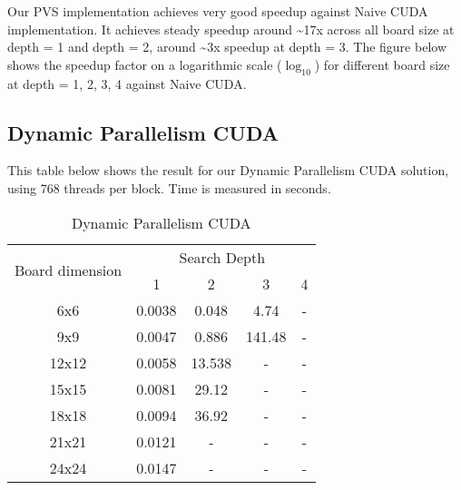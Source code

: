 \noindent
Our PVS implementation achieves very good speedup against Naive CUDA implementation. It achieves steady speedup around \textasciitilde{17}x across all board size at depth = 1 and depth = 2, around \textasciitilde{3}x speedup at depth = 3. The figure  below shows the speedup factor on a logarithmic scale ($\log_{10}$) for different board size at depth = 1, 2, 3, 4 against Naive CUDA.\\


\subsection{Dynamic Parallelism CUDA}
This table below shows the result for our Dynamic Parallelism CUDA solution, using 768 threads per block. Time is measured in seconds.\\

\begin{table}[!htbp]
\centering
\begin{tabular}{|c|c|c|c|c|} 
\hline
\multirow{2}{*}{Board dimension} & \multicolumn{4}{c|}{Search Depth}     \\ 
\cline{2-5}
                                 & 1       & 2      & 3       & 4        \\ 
\hline
6x6                              & 0.0038 & 0.048 & 4.74  & -    \\ 
\hline
9x9                              & 0.0047 & 0.886 & 141.48  & -   \\ 
\hline
12x12                            & 0.0058 & 13.538 & -  & -  \\ 
\hline
15x15                            & 0.0081 & 29.12 & - & -        \\ 
\hline
18x18                            & 0.0094 & 36.92 & -  & -        \\ 
\hline
21x21                            & 0.0121 & - & -  & -        \\ 
\hline
24x24                            & 0.0147 & - & - & -        \\
\hline
\end{tabular}
\caption{Dynamic Parallelism CUDA}
\end{table}

